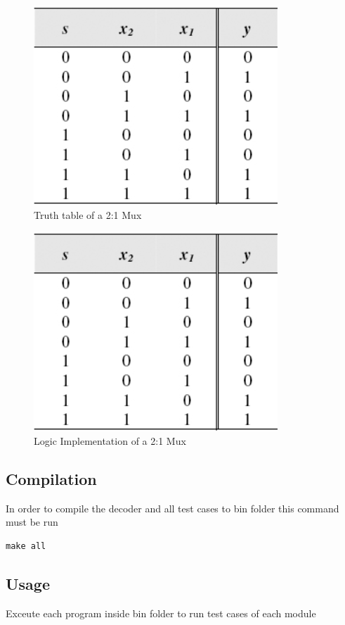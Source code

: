 \begin{figure}[H]
  \begin{centering}
  \includegraphics[scale=1]{muxtable.png}
  \par\end{centering}
  \caption{Truth table of a 2:1 Mux}
\end{figure}

\begin{figure}[H]
  \begin{centering}
  \includegraphics[scale=1]{muxtable.png}
  \par\end{centering}
  \caption{Logic Implementation of a 2:1 Mux}
\end{figure}


\subsection*{Compilation}
In order to compile the decoder and all test cases to bin folder this command must be run
\begin{lstlisting}
make all
\end{lstlisting}

\subsection*{Usage}
Exceute each program inside bin folder to run test cases of each module



